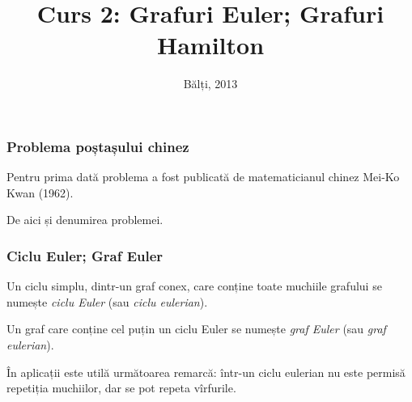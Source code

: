 \title{Curs 2: Grafuri Euler; Grafuri Hamilton}
\date{Bălți, 2013}



\maketitle

\begin{frame}
  \frametitle{Problema poștașului chinez}

\pause

Pentru prima dată problema a fost publicată de matematicianul chinez Mei-Ko Kwan (1962).

De aici și denumirea problemei.

\end{frame}

\begin{frame}
  \frametitle{Ciclu Euler; Graf Euler}

Un ciclu simplu, dintr-un graf conex, care conține toate muchiile grafului se numește \emph{ciclu Euler} (sau \emph{ciclu eulerian}).
\pause

Un graf care conține cel puțin un ciclu Euler se numește \emph{graf Euler} (sau \emph{graf eulerian}).
\pause

\alert{În aplicații este utilă următoarea remarcă:} într-un ciclu eulerian nu este permisă repetiția muchiilor, dar se pot repeta vîrfurile.
\pause

\end{frame}

